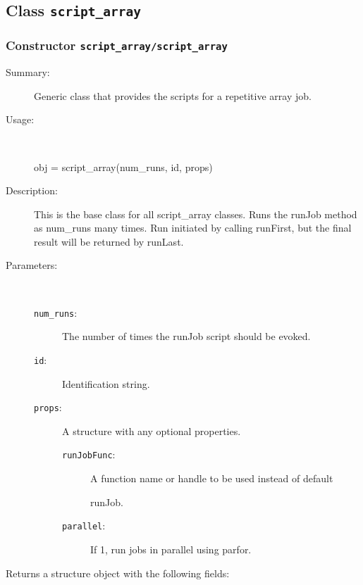 \subsection{Class \texttt{script\_array}}%
%
\label{ref_script_array}%
\hypertarget{ref_script_array}{}%
\subsubsection[Constructor \texttt{script\_array}]{Constructor \texttt{script\_array/script\_array}}%
%
\label{ref_script_array__script_array}%
\hypertarget{ref_script_array__script_array}{}%
\begin{description}
\item[Summary:]Generic class that provides the scripts for a repetitive array job.
%
\item[Usage:]~%
\begin{lyxcode}%
obj = script\_array(num\_runs, id, props)
%
\end{lyxcode}%
%
\item[Description:]%
This is the base class for all script\_array classes. Runs the runJob method as 
 num\_runs many times. Run initiated by calling runFirst, but the final
 result will be returned by runLast.
\item[Parameters:]~
\begin{description}%
\item[\texttt{num\_runs}:]
 The number of times the runJob script should be evoked.
\item[\texttt{id}:]
 Identification string.
\item[\texttt{props}:]
 A structure with any optional properties.
\begin{description}%
\item[\texttt{runJobFunc}:]
 A function name or handle to be used instead of default

runJob.
\item[\texttt{parallel}:]
 If 1, run jobs in parallel using parfor.
\end{description}%
\end{description}%
%
\item[Returns a structure object with the following fields:
]~


\end{description}
